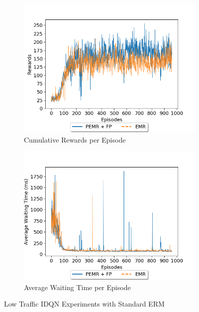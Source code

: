 \documentclass{llncs}
\begin{document}
\begin{figure}[!htbp]
    \centering
    \begin{subfigure}[b]{0.48\textwidth}
        \includegraphics[width=\textwidth]{images/ERM-Low-Load-REW.png}
  		\caption{Cumulative Rewards per Episode}
  		\label{fig:ERMIDQNREW}
    \end{subfigure}
    \begin{subfigure}[b]{0.48\textwidth}
        \includegraphics[width=\textwidth]{images/ERM-Low-Load-AWT.png}
  		\caption{Average Waiting Time per Episode}
  		\label{fig:ERMIDQNAWT}
    \end{subfigure}
    \caption{Low Traffic IDQN Experiments with Standard ERM}\label{fig:ERMIDQNExp}
\end{figure}
\end{document}
